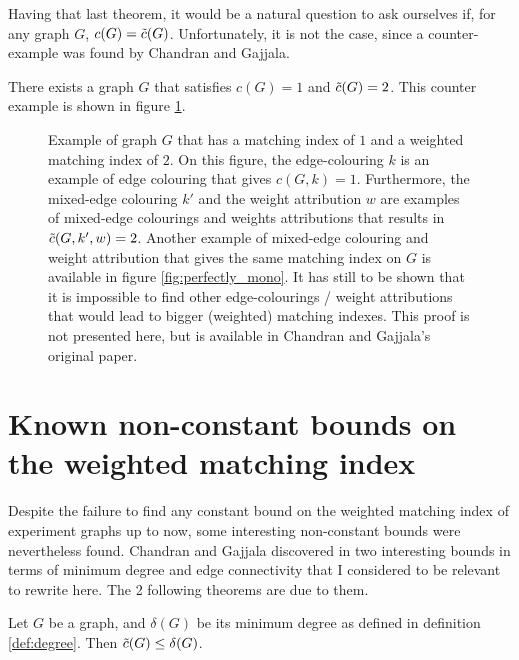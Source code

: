 Having that last theorem, it would be a natural question to ask ourselves if, for any graph $G$, $c(G) = \Tilde{c}(G)$. Unfortunately, it is not the case, since a counter-example was found by Chandran and Gajjala. \cite{chandran}

\begin{observation}
    \label{obs:c_not_c_tilde}
    There exists a graph $G$ that satisfies $c(G) = 1$ and $\Tilde{c}(G) = 2$. This counter example is shown in figure \ref{fig:proof_c_not_c_tilde}.
\end{observation}

\begin{figure}[H]
    \caption{Example of graph $G$ that has a matching index of $1$ and a weighted matching index of $2$. On this figure, the edge-colouring $k$ is an example of edge colouring that gives $c(G, k) = 1$. Furthermore, the mixed-edge colouring $k'$ and the weight attribution $w$ are examples of mixed-edge colourings and weights attributions that results in $\Tilde{c}(G, k', w) = 2$. Another example of mixed-edge colouring and weight attribution that gives the same matching index on $G$ is available in figure \ref{fig:perfectly_mono}. It has still to be shown that it is impossible to find other edge-colourings / weight attributions that would lead to bigger (weighted) matching indexes. This proof is not presented here, but is available in Chandran and Gajjala's original paper. \cite{chandran}}
    \label{fig:proof_c_not_c_tilde}
\end{figure}


\section{Known non-constant bounds on the weighted matching index}

Despite the failure to find any constant bound on the weighted matching index of experiment graphs up to now, some interesting non-constant bounds were nevertheless found. Chandran and Gajjala discovered in \cite{chandran} two interesting bounds in terms of minimum degree and edge connectivity that I considered to be relevant to rewrite here. The 2 following theorems are due to them.

\begin{lemma}
    \label{lem:bound_min_degree}
    Let $G$ be a graph, and $\delta(G)$ be its minimum degree as defined in definition \ref{def:degree}. Then $\Tilde{c}(G) \leq \delta(G)$.
\end{lemma}

